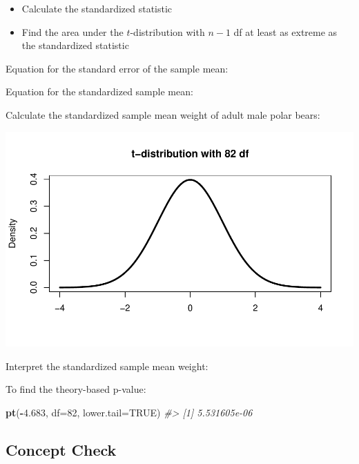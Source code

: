 \documentclass[
]{report}
\newenvironment{Shaded}{\begin{snugshade}}{\end{snugshade}}
\newcommand{\AttributeTok}[1]{\textcolor[rgb]{0.13,0.29,0.53}{#1}}
\newcommand{\CommentTok}[1]{\textcolor[rgb]{0.56,0.35,0.01}{\textit{#1}}}
\newcommand{\ConstantTok}[1]{\textcolor[rgb]{0.56,0.35,0.01}{#1}}
\newcommand{\DecValTok}[1]{\textcolor[rgb]{0.00,0.00,0.81}{#1}}
\newcommand{\FloatTok}[1]{\textcolor[rgb]{0.00,0.00,0.81}{#1}}
\newcommand{\FunctionTok}[1]{\textcolor[rgb]{0.13,0.29,0.53}{\textbf{#1}}}
\newcommand{\NormalTok}[1]{#1}
\newcommand{\SpecialCharTok}[1]{\textcolor[rgb]{0.81,0.36,0.00}{\textbf{#1}}}
\begin{document}
\begin{itemize}
\item
  Calculate the standardized statistic
\item
  Find the area under the \(t\)-distribution with \(n - 1\) df at least as extreme as the standardized statistic
\end{itemize}

Equation for the standard error of the sample mean:

\vspace{0.5in}

Equation for the standardized sample mean:

\vspace{0.5in}

Calculate the standardized sample mean weight of adult male polar bears:

\vspace{0.4in}

\begin{center}\includegraphics[width=0.7\linewidth]{06-VN06-EDAonemeanSim_files/figure-latex/pvaluepb-1} \end{center}

Interpret the standardized sample mean weight:

\vspace{0.8in}

To find the theory-based p-value:

\begin{Shaded}
\begin{Highlighting}[]
\FunctionTok{pt}\NormalTok{(}\SpecialCharTok{{-}}\FloatTok{4.683}\NormalTok{, }\AttributeTok{df=}\DecValTok{82}\NormalTok{, }\AttributeTok{lower.tail=}\ConstantTok{TRUE}\NormalTok{)}
\CommentTok{\#\textgreater{} [1] 5.531605e{-}06}
\end{Highlighting}
\end{Shaded}

\subsection{Concept Check}\label{concept-check-5}
\end{document}
